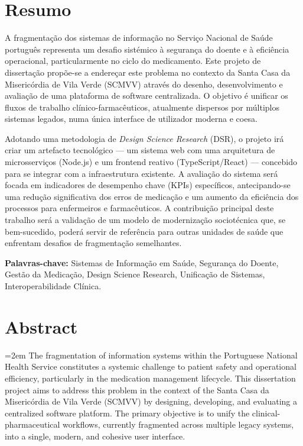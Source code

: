 \chapter*{Resumo}

A fragmentação dos sistemas de informação no Serviço Nacional de Saúde português representa um desafio sistémico à segurança do doente e à eficiência operacional, particularmente no ciclo do medicamento. Este projeto de dissertação propõe-se a endereçar este problema no contexto da Santa Casa da Misericórdia de Vila Verde (SCMVV) através do desenho, desenvolvimento e avaliação de uma plataforma de software centralizada. O objetivo é unificar os fluxos de trabalho clínico-farmacêuticos, atualmente dispersos por múltiplos sistemas legados, numa única interface de utilizador moderna e coesa.

Adotando uma metodologia de \textit{Design Science Research} (DSR), o projeto irá criar um artefacto tecnológico — um sistema web com uma arquitetura de microsserviços (Node.js) e um frontend reativo (TypeScript/React) — concebido para se integrar com a infraestrutura existente. A avaliação do sistema será focada em indicadores de desempenho chave (KPIs) específicos, antecipando-se uma redução significativa dos erros de medicação e um aumento da eficiência dos processos para enfermeiros e farmacêuticos. A contribuição principal deste trabalho será a validação de um modelo de modernização sociotécnica que, se bem-sucedido, poderá servir de referência para outras unidades de saúde que enfrentam desafios de fragmentação semelhantes.

\vspace{6mm}
\noindent\textbf{Palavras-chave:} Sistemas de Informação em Saúde, Segurança do Doente, Gestão da Medicação, Design Science Research, Unificação de Sistemas, Interoperabilidade Clínica.

\vspace*{\fill}

\chapter*{Abstract}

\begingroup
\emergencystretch=2em
\sloppy
The fragmentation of information systems within the Portuguese National Health Service constitutes a systemic challenge to patient safety and operational efficiency, particularly in the medication management lifecycle. This dissertation project aims to address this problem in the context of the Santa Casa da Misericórdia de Vila Verde (SCMVV) by designing, developing, and evaluating a centralized software platform. The primary objective is to unify the clinical-pharmaceutical workflows, currently fragmented across multiple legacy systems, into a single, modern, and cohesive user interface.

